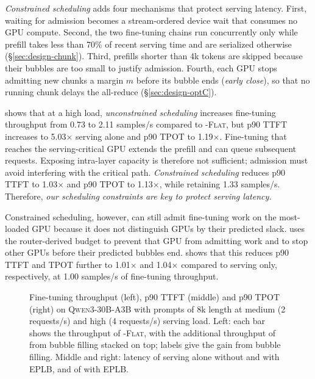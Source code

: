  \emph{Constrained scheduling} adds four mechanisms that protect serving latency. First, waiting for admission becomes a stream-ordered device wait that consumes no GPU compute.
Second, the two fine-tuning chains run concurrently only while prefill takes less than 70\% of recent serving time and are serialized otherwise (\S\ref{sec:design-chunk}).
Third, prefills shorter than 4k tokens are skipped because their bubbles are too small to justify admission.
Fourth, each GPU stops admitting new chunks a margin $m$ before its bubble ends (\emph{early close}), so that no running chunk delays the all-reduce (\S\ref{sec:design-optC}).

 shows that at a high load, \emph{unconstrained scheduling} increases fine-tuning throughput from 0.73 to 2.11 samples/s compared to \sys-\textsc{Flat}, but p90 \ac{TTFT} increases to 5.03$\times$ serving alone and p90 \ac{TPOT} to 1.19$\times$.
Fine-tuning that reaches the serving-critical GPU extends the prefill and can queue subsequent requests.
Exposing intra-layer capacity is therefore not sufficient; admission must avoid interfering with the critical path.
\emph{Constrained scheduling} reduces p90 \ac{TTFT} to 1.03$\times$ and p90 \ac{TPOT} to 1.13$\times$, while retaining 1.33 samples/s.
Therefore, \emph{our scheduling constraints are key to protect serving latency.}

Constrained scheduling, however, can still admit fine-tuning work on the most-loaded GPU because it does not distinguish GPUs by their predicted slack.
\sys uses the router-derived budget to prevent that GPU from admitting work and to stop other GPUs before their predicted bubbles end.
 shows that this reduces p90 \ac{TTFT} and \ac{TPOT} further to 1.01$\times$ and
1.04$\times$ compared to serving only, respectively, at 1.00 samples/s of fine-tuning throughput.

\begin{figure}[t]
  \centering
  \caption{Fine-tuning throughput (left), p90 \ac{TTFT} (middle) and p90 \ac{TPOT} (right) on \textsc{Qwen3-30B-A3B} with prompts of 8k length at medium (2 requests/s) and high (4 requests/s) serving load. Left: each bar shows the throughput of \sys-\textsc{Flat}, with the additional throughput of \sys from bubble filling stacked on top; labels give the gain from bubble filling. Middle and right: latency of serving alone without and with \ac{EPLB}, and of  \sys with \ac{EPLB}.}
  \label{fig:eval-eplb}
\end{figure}

